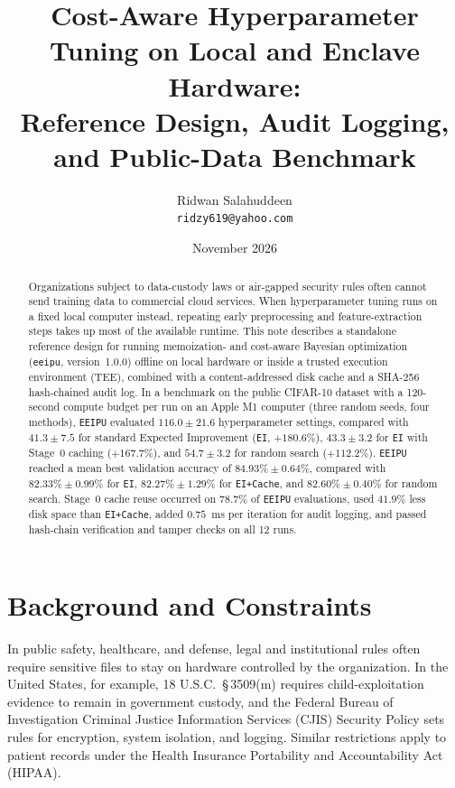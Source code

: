 \documentclass[11pt,letterpaper]{article}
\title{\textbf{Cost-Aware Hyperparameter Tuning on Local and Enclave Hardware:\\Reference Design, Audit Logging, and Public-Data Benchmark}}
\author{
  Ridwan Salahuddeen\\
  \texttt{ridzy619@yahoo.com}
}
\date{November 2026}
\begin{document}
\maketitle

\begin{abstract}
Organizations subject to data-custody laws or air-gapped security rules often cannot send training data to commercial cloud services. When hyperparameter tuning runs on a fixed local computer instead, repeating early preprocessing and feature-extraction steps takes up most of the available runtime. This note describes a standalone reference design for running memoization- and cost-aware Bayesian optimization (\texttt{eeipu}, version~1.0.0) offline on local hardware or inside a trusted execution environment (TEE), combined with a content-addressed disk cache and a SHA-256 hash-chained audit log. In a benchmark on the public CIFAR-10 dataset with a 120-second compute budget per run on an Apple M1 computer (three random seeds, four methods), \texttt{EEIPU} evaluated $116.0 \pm 21.6$ hyperparameter settings, compared with $41.3 \pm 7.5$ for standard Expected Improvement (\texttt{EI}, $+180.6\%$), $43.3 \pm 3.2$ for \texttt{EI} with Stage~0 caching ($+167.7\%$), and $54.7 \pm 3.2$ for random search ($+112.2\%$). \texttt{EEIPU} reached a mean best validation accuracy of $84.93\% \pm 0.64\%$, compared with $82.33\% \pm 0.99\%$ for \texttt{EI}, $82.27\% \pm 1.29\%$ for \texttt{EI+Cache}, and $82.60\% \pm 0.40\%$ for random search. Stage~0 cache reuse occurred on $78.7\%$ of \texttt{EEIPU} evaluations, used $41.9\%$ less disk space than \texttt{EI+Cache}, added $0.75$~ms per iteration for audit logging, and passed hash-chain verification and tamper checks on all 12 runs.
\end{abstract}

\section{Background and Constraints}
In public safety, healthcare, and defense, legal and institutional rules often require sensitive files to stay on hardware controlled by the organization. In the United States, for example, 18 U.S.C.\ \S\,3509(m) requires child-exploitation evidence to remain in government custody, and the Federal Bureau of Investigation Criminal Justice Information Services (CJIS) Security Policy sets rules for encryption, system isolation, and logging. Similar restrictions apply to patient records under the Health Insurance Portability and Accountability Act (HIPAA).
\end{document}
